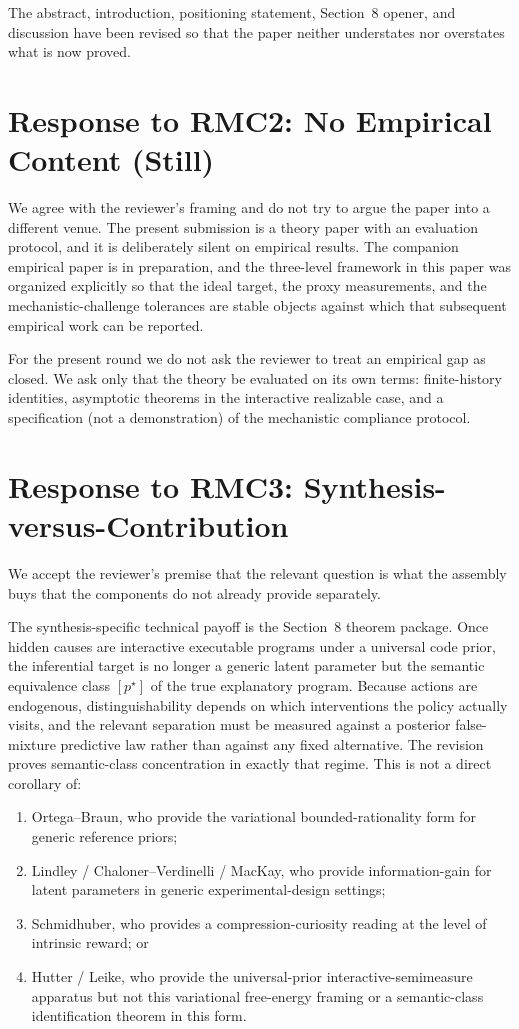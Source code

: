 \documentclass[11pt]{article}
\begin{document}
The abstract, introduction, positioning statement, Section~8 opener, and discussion have been revised so that the paper neither understates nor overstates what is now proved.

\section*{Response to RMC2: No Empirical Content (Still)}

We agree with the reviewer's framing and do not try to argue the paper into a different venue. The present submission is a theory paper with an evaluation protocol, and it is deliberately silent on empirical results. The companion empirical paper is in preparation, and the three-level framework in this paper was organized explicitly so that the ideal target, the proxy measurements, and the mechanistic-challenge tolerances are stable objects against which that subsequent empirical work can be reported.

For the present round we do not ask the reviewer to treat an empirical gap as closed. We ask only that the theory be evaluated on its own terms: finite-history identities, asymptotic theorems in the interactive realizable case, and a specification (not a demonstration) of the mechanistic compliance protocol.

\section*{Response to RMC3: Synthesis-versus-Contribution}

We accept the reviewer's premise that the relevant question is what the assembly buys that the components do not already provide separately.

The synthesis-specific technical payoff is the Section~8 theorem package. Once hidden causes are interactive executable programs under a universal code prior, the inferential target is no longer a generic latent parameter but the semantic equivalence class $[p^\star]$ of the true explanatory program. Because actions are endogenous, distinguishability depends on which interventions the policy actually visits, and the relevant separation must be measured against a posterior false-mixture predictive law rather than against any fixed alternative. The revision proves semantic-class concentration in exactly that regime. This is not a direct corollary of:
\begin{enumerate}
\item Ortega--Braun, who provide the variational bounded-rationality form for generic reference priors;
\item Lindley / Chaloner--Verdinelli / MacKay, who provide information-gain for latent parameters in generic experimental-design settings;
\item Schmidhuber, who provides a compression-curiosity reading at the level of intrinsic reward; or
\item Hutter / Leike, who provide the universal-prior interactive-semimeasure apparatus but not this variational free-energy framing or a semantic-class identification theorem in this form.
\end{enumerate}
\end{document}
